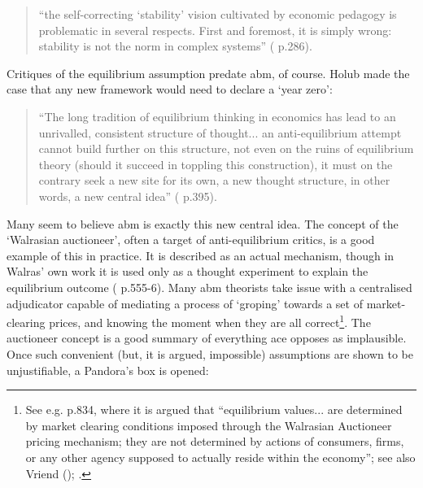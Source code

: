 \begin{quote}
``the self-correcting `stability' vision cultivated by economic pedagogy is problematic in several respects. First and foremost, it is simply wrong: stability is not the norm in complex systems'' (\citealt{colander_sins_2010} p.286).
\end{quote}

Critiques of the equilibrium assumption predate \gls{abm}, of course. Holub made the case that any new framework would need to declare a `year zero': 

\begin{quote}
``The long tradition of equilibrium thinking in economics has lead to an unrivalled, consistent structure of thought... an anti-equilibrium attempt cannot build further on this structure, not even on the ruins of equilibrium theory (should it succeed in toppling this construction), it must on the contrary seek a new site for its own, a new thought structure, in other words, a new central idea'' (\citealt{holub_anti-equilibrium_1977} p.395). 
\end{quote}

Many seem to believe \gls{abm} is exactly this new central idea. The concept of the `Walrasian auctioneer', often a target of anti-equilibrium critics, is a good example of this in practice. It is described as an actual mechanism, though in Walras' own work it is used only as a thought experiment to explain the equilibrium outcome (\citealt{blaug_economic_1997} p.555-6). Many \gls{abm} theorists take issue with a centralised adjudicator capable of mediating a process of `groping' towards a set of market-clearing prices, and knowing the moment when they are all correct\footnote{See e.g. \citealt{tesfatsion_agent-based_2006} p.834, where it is argued that ``equilibrium values... are determined by market clearing conditions imposed through the Walrasian Auctioneer pricing mechanism; they are not determined by actions of consumers, firms, or any other agency supposed to actually reside within the economy''; see also Vriend (\citeyear{vriend_walrasian_1991}); \citealt{consiglio_artificial_2007-1}.}. The auctioneer concept is a good summary of everything \gls{ace} opposes as implausible. Once such convenient (but, it is argued, impossible) assumptions are shown to be unjustifiable, a Pandora's box is opened:

